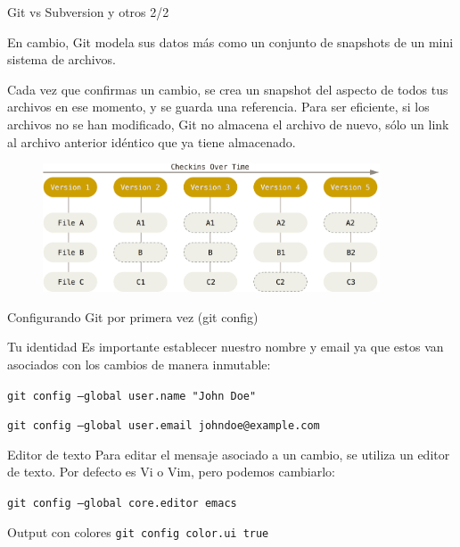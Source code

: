 \documentclass{beamer}
\begin{document}
\begin{frame}{Git vs Subversion y otros 2/2}

     En cambio, Git modela sus datos más como un conjunto de snapshots de un mini sistema de archivos.

     \vspace{0.5em}

     Cada vez que confirmas un cambio, se crea un snapshot del aspecto de todos tus archivos en ese momento, y se guarda una referencia.
     Para ser eficiente, si los archivos no se han modificado, Git no almacena el archivo de nuevo, sólo
     un link al archivo anterior idéntico que ya tiene almacenado.

    \vspace{0.5em}

    \begin{figure}[ht]
        \begin{center}
            \includegraphics[height=1.5in]{images/git-data.png}
        \end{center}
    \end{figure}

\end{frame}

\begin{frame}{Configurando Git por primera vez (git config)}

    \begin{block}{Tu identidad}
        Es importante establecer nuestro nombre y email ya que estos van asociados con los cambios de manera inmutable:

        \vspace{0.5em}

        \texttt{git config --global user.name "John Doe"}

        \texttt{git config --global user.email johndoe@example.com}
    \end{block}

    \begin{block}{Editor de texto}
        Para editar el mensaje asociado a un cambio, se utiliza un editor de texto.
        Por defecto es Vi o Vim, pero podemos cambiarlo:

        \vspace{0.5em}

        \texttt{git config --global core.editor emacs}
    \end{block}

    \begin{block}{Output con colores}
        \texttt{git config color.ui true}
    \end{block}

\end{frame}
\end{document}
